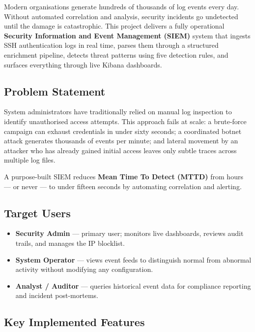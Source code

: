 \documentclass[12pt,a4paper]{article}
\begin{document}
Modern organisations generate hundreds of thousands of log events every day.
Without automated correlation and analysis, security incidents go undetected
until the damage is catastrophic. This project delivers a fully operational
\textbf{Security Information and Event Management (SIEM)} system that ingests
SSH authentication logs in real time, parses them through a structured
enrichment pipeline, detects threat patterns using five detection rules, and
surfaces everything through live Kibana dashboards.

\subsection*{Problem Statement}

System administrators have traditionally relied on manual log inspection to
identify unauthorised access attempts. This approach fails at scale: a
brute-force campaign can exhaust credentials in under sixty seconds; a
coordinated botnet attack generates thousands of events per minute; and
lateral movement by an attacker who has already gained initial access leaves
only subtle traces across multiple log files.

A purpose-built SIEM reduces \textbf{Mean Time To Detect (MTTD)} from hours —
or never — to under fifteen seconds by automating correlation and alerting.

\subsection*{Target Users}

\begin{itemize}[leftmargin=2em]
  \item \textbf{Security Admin} — primary user; monitors live dashboards,
        reviews audit trails, and manages the IP blocklist.
  \item \textbf{System Operator} — views event feeds to distinguish normal
        from abnormal activity without modifying any configuration.
  \item \textbf{Analyst / Auditor} — queries historical event data for
        compliance reporting and incident post-mortems.
\end{itemize}

\subsection*{Key Implemented Features}
\end{document}
